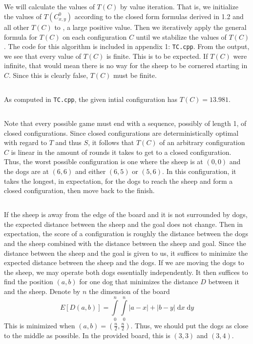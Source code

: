 \documentclass{article}
\begin{document}
\subsection{}
We will calculate the values of $T(C)$ by value iteration. That is, we initialize the values of $T(C^0_{x,y})$ according to the closed form formulas derived in 1.2 and all other $T(C)$ to , a large positive value. Then we iteratively apply the general formula for $T(C)$ on each configuration $C$ until we stabilize the values of $T(C)$. The code for this algorithm is included in appendix 1: \verb|TC.cpp|. From the output, we see that every value of $T(C)$ is finite. This is to be expected. If $T(C)$ were infinite, that would mean there is no way for the sheep to be cornered starting in $C$. Since this is clearly false, $T(C)$ must be finite.

\subsection{}
As computed in \verb|TC.cpp|, the given intial configuration has $T(C) = 13.981$.

\subsection{}
Note that every possible game must end with a sequence, possibly of length 1, of closed configurations. Since closed configurations are deterministically optimal with regard to $T$ and thus $S$, it follows that $T(C)$ of an arbitrary configuration $C$ is linear in the amount of rounds it takes to get to a closed configuration. Thus, the worst possible configuration is one where the sheep is at $(0,0)$ and the dogs are at $(6,6)$ and either $(6,5)$ or $(5,6)$. In this configuration, it takes the longest, in expectation, for the dogs to reach the sheep and form a closed configuration, then move back to the finish.

\subsection{}
If the sheep is away from the edge of the board and it is not surrounded by dogs, the expected distance between the sheep and the goal does not change. Then in expectation, the score of a configuration is roughly the distance between the dogs and the sheep combined with the distance between the sheep and goal. Since the distance between the sheep and the goal is given to us, it suffices to minimize the expected distance between the sheep and the dogs. If we are moving the dogs to the sheep, we may operate both dogs essentially independently. It then suffices to find the position $(a,b)$ for one dog that minimizes the distance $D$ between it and the sheep. Denote by $n$ the dimension of the board
$$E[D(a,b)] = \int\limits_0^n \int\limits_0^n |a-x|+|b-y| \;\mathrm{d}x \;\mathrm{d}y$$
This is minimized when $(a,b) = (\tfrac{n}{2},\tfrac{n}{2})$. Thus, we should put the dogs as close to the middle as possible. In the provided board, this is $(3,3)$ and $(3,4)$.
\end{document}
